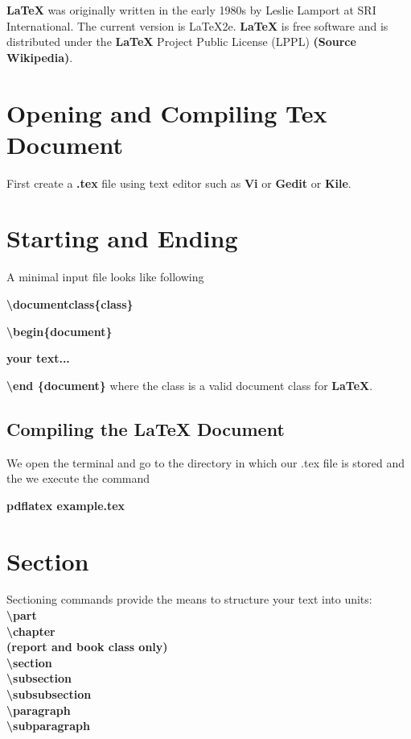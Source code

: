 \documentclass[11pt,a4paper]{article}
\begin{document}
\bigskip
\textbf{LaTeX} was originally written in the early 1980s by Leslie Lamport at
SRI International. The current version is LaTeX2e. \textbf{LaTeX} is free
software and is distributed under the \textbf{LaTeX} Project Public License
(LPPL) \textbf{(Source Wikipedia)}.

\section{Opening and Compiling Tex Document}
First create a \textbf{.tex} file using text editor such as \textbf{Vi} or
\textbf{Gedit} or \textbf{Kile}.

\section{Starting and Ending}
A minimal input file looks like following
\bigskip

\textbf{\textbackslash documentclass\{class\}}


\textbf{\textbackslash begin\{document\}}




\qquad \textbf{your text...}


\textbf{\textbackslash end \{document\}}
\newline
\newline
where the class is a valid document class for \textbf{LaTeX}.

\subsection{Compiling the LaTeX Document}
We open the terminal and go to the directory in which our .tex file is stored
and the we execute the command

\bigskip
\textbf{pdflatex example.tex} 


\section{Section}
Sectioning commands provide the means to structure your text into units: 
\\
\textbf{
\textbackslash part \\
\linebreak
\textbackslash chapter \\
\linebreak
(report and book class only) \\
\linebreak
\textbackslash section \\
\linebreak
\textbackslash subsection \\
\linebreak
\textbackslash subsubsection \\
\linebreak
\textbackslash paragraph \\
\linebreak
\textbackslash subparagraph \\
\linebreak
}
\end{document}

